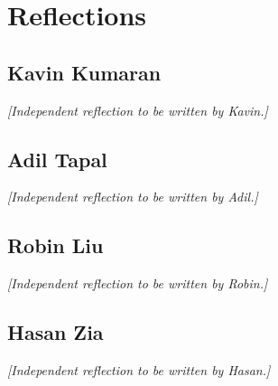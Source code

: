\documentclass{article}
\begin{document}
\section{Reflections}

\subsection*{Kavin Kumaran}
\textit{[Independent reflection to be written by Kavin.]}

\subsection*{Adil Tapal}
\textit{[Independent reflection to be written by Adil.]}

\subsection*{Robin Liu}
\textit{[Independent reflection to be written by Robin.]}

\subsection*{Hasan Zia}
\textit{[Independent reflection to be written by Hasan.]}

\end{document}
